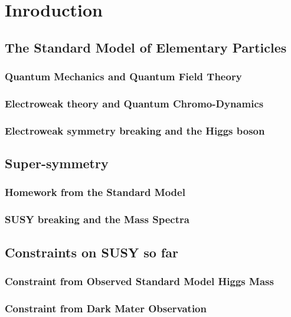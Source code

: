 \tableofcontents
 

\section{Inroduction}
	\subsection{The Standard Model of Elementary Particles}
		\subsubsection{Quantum Mechanics and Quantum Field Theory} 
		\subsubsection{Electroweak theory and Quantum Chromo-Dynamics} 
		\subsubsection{Electroweak symmetry breaking and the Higgs boson}
%
	\subsection{Super-symmetry}
		\subsubsection{Homework from the Standard Model}
		\subsubsection{SUSY breaking and the Mass Spectra}
%
	\subsection{Constraints on SUSY so far} 
		\subsubsection{Constraint from Observed Standard Model Higgs Mass}
		\subsubsection{Constraint from Dark Mater Observation}
